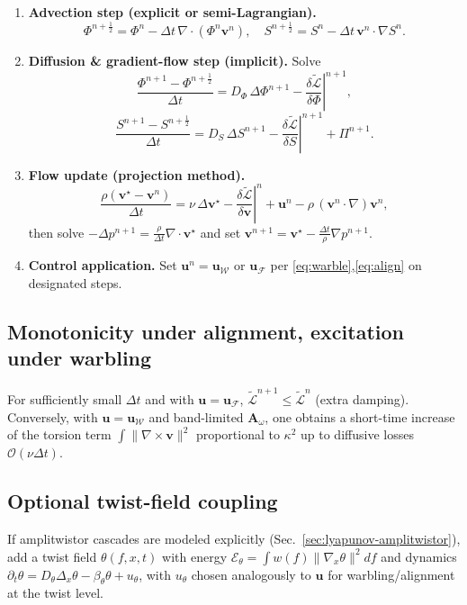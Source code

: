 \documentclass[a4paper,11pt]{article}
\begin{document}
\begin{enumerate}
\item \textbf{Advection step (explicit or semi-Lagrangian).}
\[
\Phi^{n+\frac{1}{2}}= \Phi^n - \Delta t\,\nabla\!\cdot(\Phi^n \mathbf{v}^n),\quad
S^{n+\frac{1}{2}}= S^n - \Delta t\,\mathbf{v}^n\!\cdot\!\nabla S^n.
\]
\item \textbf{Diffusion \& gradient-flow step (implicit).}
Solve
\[
\frac{\Phi^{n+1}-\Phi^{n+\frac{1}{2}}}{\Delta t}
=
D_\Phi\,\Delta \Phi^{n+1}
-\left.\frac{\delta \widetilde{\mathcal{L}}}{\delta \Phi}\right|^{n+1},
\]
\[
\frac{S^{n+1}-S^{n+\frac{1}{2}}}{\Delta t}
=
D_S\,\Delta S^{n+1}
-\left.\frac{\delta \widetilde{\mathcal{L}}}{\delta S}\right|^{n+1}
+\Pi^{n+1}.
\]
\item \textbf{Flow update (projection method).}
\[
\frac{\rho(\mathbf{v}^\star-\mathbf{v}^n)}{\Delta t}
=
\nu\,\Delta \mathbf{v}^\star
-\left.\frac{\delta \widetilde{\mathcal{L}}}{\delta \mathbf{v}}\right|^n
+\mathbf{u}^n
-\rho\,(\mathbf{v}^n\!\cdot\!\nabla)\mathbf{v}^n,
\]
then solve \(-\Delta p^{n+1} = \frac{\rho}{\Delta t}\nabla\!\cdot \mathbf{v}^\star\) and set
\(\mathbf{v}^{n+1}=\mathbf{v}^\star - \frac{\Delta t}{\rho}\nabla p^{n+1}\).
\item \textbf{Control application.} Set \(\mathbf{u}^n=\mathbf{u}_{\mathcal{W}}\) or
\(\mathbf{u}_{\mathcal{F}}\) per \eqref{eq:warble},\eqref{eq:align} on designated steps.
\end{enumerate}

\subsection{Monotonicity under alignment, excitation under warbling}
For sufficiently small \(\Delta t\) and with \(\mathbf{u}=\mathbf{u}_{\mathcal{F}}\),
\(\widetilde{\mathcal{L}}^{n+1}\le \widetilde{\mathcal{L}}^{n}\) (extra damping).
Conversely, with \(\mathbf{u}=\mathbf{u}_{\mathcal{W}}\) and band-limited
\(\mathbf{A}_\omega\), one obtains a short-time increase of the torsion term
\(\int \|\nabla\times \mathbf{v}\|^2\) proportional to \(\kappa^2\) up to diffusive
losses \(\mathcal{O}(\nu \Delta t)\).

\subsection{Optional twist-field coupling}
If amplitwistor cascades are modeled explicitly (Sec.~\ref{sec:lyapunov-amplitwistor}),
add a twist field \(\theta(f,x,t)\) with energy
\(\mathcal{E}_\theta=\int w(f)\|\nabla_x \theta\|^2 df\) and dynamics
\(\partial_t \theta = D_\theta \Delta_x \theta - \beta_\theta \theta + u_\theta\),
with \(u_\theta\) chosen analogously to \(\mathbf{u}\) for warbling/alignment at the twist level.
\end{document}
